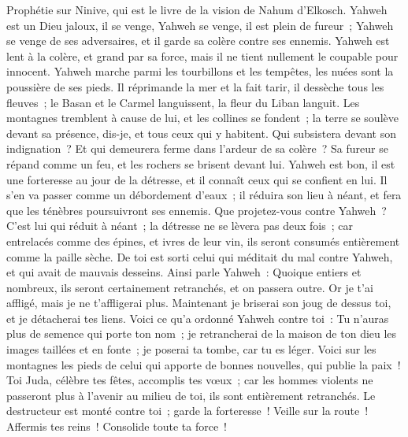 \begin{multicols}{2}
\VerseOne{}Prophétie sur Ninive, qui est le livre de la vision de Nahum d'Elkosch.
Yahweh est un Dieu jaloux, il se venge, Yahweh se venge, il est plein de fureur~; Yahweh se venge de ses adversaires, et il garde sa colère contre ses ennemis.
Yahweh est lent à la colère, et grand par sa force, mais il ne tient nullement le coupable pour innocent. Yahweh marche parmi les tourbillons et les tempêtes, les nuées sont la poussière de ses pieds.
Il réprimande la mer et la fait tarir, il dessèche tous les fleuves~; le Basan et le Carmel languissent, la fleur du Liban languit.
Les montagnes tremblent à cause de lui, et les collines se fondent~; la terre se soulève devant sa présence, dis-je, et tous ceux qui y habitent.
Qui subsistera devant son indignation~? Et qui demeurera ferme dans l'ardeur de sa colère~? Sa fureur se répand comme un feu, et les rochers se brisent devant lui.
Yahweh est bon, il est une forteresse au jour de la détresse, et il connaît ceux qui se confient en lui.
Il s'en va passer comme un débordement d'eaux~; il réduira son lieu à néant, et fera que les ténèbres poursuivront ses ennemis.
Que projetez-vous contre Yahweh~? C'est lui qui réduit à néant~; la détresse ne se lèvera pas deux fois~;
car entrelacés comme des épines, et ivres de leur vin, ils seront consumés entièrement comme la paille sèche.
De toi est sorti celui qui méditait du mal contre Yahweh, et qui avait de mauvais desseins.
Ainsi parle Yahweh~: Quoique entiers et nombreux, ils seront certainement retranchés, et on passera outre. Or je t'ai affligé, mais je ne t'affligerai plus.
Maintenant je briserai son joug de dessus toi, et je détacherai tes liens.
Voici ce qu'a ordonné Yahweh contre toi~: Tu n'auras plus de semence qui porte ton nom~; je retrancherai de la maison de ton dieu les images taillées et en fonte~; je poserai ta tombe, car tu es léger.
\VerseOne{}Voici sur les montagnes les pieds de celui qui apporte de bonnes nouvelles, qui publie la paix~! Toi Juda, célèbre tes fêtes, accomplis tes vœux~; car les hommes violents ne passeront plus à l'avenir au milieu de toi, ils sont entièrement retranchés.
Le destructeur est monté contre toi~; garde la forteresse~! Veille sur la route~! Affermis tes reins~! Consolide toute ta force~!

\end{multicols}
